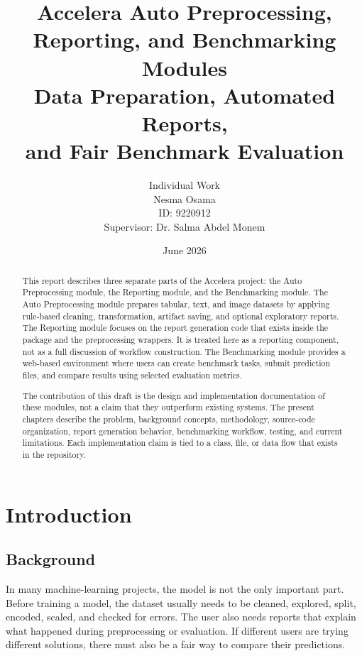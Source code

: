 \documentclass[12pt,a4paper,oneside]{report}
\title{
  \vspace{-1.5cm}
  \textbf{Accelera Auto Preprocessing, Reporting, and Benchmarking Modules}\\[0.4em]
  \Large Data Preparation, Automated Reports,\\
  and Fair Benchmark Evaluation
}
\author{
  Individual Work\\[0.5em]
  Nesma Osama\\
  ID: 9220912\\[0.6em]
  Supervisor: Dr. Salma Abdel Monem
}
\date{June 2026}
\newcommand{\systemname}{Accelera}
\newcommand{\modulepath}[1]{\texttt{\detokenize{#1}}}
\begin{document}
\maketitle

\begin{abstract}
This report describes three separate parts of the \systemname{} project:
the Auto Preprocessing module, the Reporting module, and the Benchmarking
module. The Auto Preprocessing module prepares tabular, text, and image
datasets by applying rule-based cleaning, transformation, artifact saving, and
optional exploratory reports. The Reporting module focuses on the report
generation code that exists inside the \modulepath{accelera_pipe} package and the preprocessing
wrappers. It is treated here as a reporting component, not as a full discussion
of workflow construction. The Benchmarking module provides a web-based
environment where users can create benchmark tasks, submit prediction files,
and compare results using selected evaluation metrics.

The contribution of this draft is the design and implementation documentation
of these modules, not a claim that they outperform existing systems. The
present chapters describe the problem, background concepts, methodology,
source-code organization, report generation behavior, benchmarking workflow,
testing, and current limitations. Each implementation claim is tied to a class,
file, or data flow that exists in the repository.
\end{abstract}

\tableofcontents
\listoftables
\clearpage

\chapter{Introduction}
\label{chap:introduction}

\section{Background}

In many machine-learning projects, the model is not the only important part.
Before training a model, the dataset usually needs to be cleaned, explored,
split, encoded, scaled, and checked for errors. The user also needs reports
that explain what happened during preprocessing or evaluation. If different
users are trying different solutions, there must also be a fair way to compare
their predictions.
\end{document}
